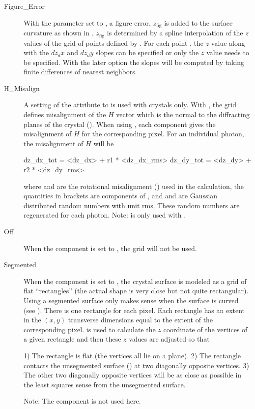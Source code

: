 \begin{description}
\item[Figure_Error] \Newline
With the  parameter set to , a figure error, $z_\text{fig}$ is added to
the surface curvature as shown in . $z_\text{fig}$ is determined by a spline
interpolation of the $z$ values of the grid of points defined by . For each point
, the $z$ value along with the $dz_dx$ and $dz_dy$ slopes can be specified or only
the $z$ value needs to be specified. With the later option the slopes will be computed by taking
finite differences of nearest neighbors.
%
\item[H_Misalign] \Newline
A setting of the  attribute to  is used with crystals only. With
, the grid defines misalignment of the $H$ vector which is the normal to the
diffracting planes of the crystal ().  When using , each
 component gives the misalignment of $H$ for the corresponding pixel. For an individual
photon, the misalignment of $H$ will be
\begin{example}
  dz_dx_tot = <dz_dx> + r1 * <dz_dx_rms>
  dz_dy_tot = <dz_dy> + r2 * <dz_dy_rms>
\end{example}
where  and  are the rotational misalignment () used
in the calculation, the quantities in brackets  are components of , and  and
 are Gaussian distributed random numbers with unit rms. These random numbers are regenerated
for each photon. Note:  is only used with .
%
\item[Off] \Newline
When the  component is set to , the grid will not be used.
%
\item[Segmented] \Newline
When the  component is set to , the crystal surface is modeled as a grid of
flat ``rectangles'' (the actual shape is very close but not quite rectangular). Using a segmented
surface only makes sense when the surface is curved (see ). There is one rectangle for
each pixel. Each rectangle has an extent in the $(x,y)$ transverse dimensions equal to the extent of
the corresponding pixel.  is used to calculate the $z$ coordinate of the vertices of a given
rectangle and then these $z$ values are adjusted so that
\begin{example}
  1) The rectangle is flat (the vertices all lie on a plane).
  2) The rectangle contacts the unsegmented surface () at two diagonally opposite vertices.
  3) The other two diagonally opposite vertices will be as close as possible in the
     least squares sense from the unsegmented surface.
\end{example}
Note: The  component is not used here.
\end{description}

